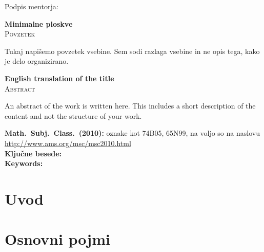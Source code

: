 \documentclass[12pt,a4paper,twoside]{article}
\newcommand{\naslovdela}{Minimalne ploskve}
\newcommand{\kljucnebesede}{} %
\newcommand{\keywords}{} %
\newcommand{\sep}{, }  %
\theoremstyle{definition} %
\theoremstyle{plain} %
\numberwithin{equation}{section}  %
\begin{document}
\vspace{2cm}
\hspace*{\fill} Podpis mentorja: \phantom{prostor za podpis}


\cleardoublepage
{}

\begin{center}
\textbf{\naslovdela} \\[3mm]
\textsc{Povzetek} \\[2mm]
\end{center}
Tukaj napišemo povzetek vsebine. Sem sodi razlaga vsebine in ne opis tega, kako je delo
organizirano.

\vfill
\begin{center}
\textbf{English translation of the title} \\[3mm] %
\textsc{Abstract}\\[2mm]
\end{center}

An abstract of the work is written here. This includes a short description of
the content and not the structure of your work.

\vfill\noindent
\textbf{Math.~Subj.~Class.~(2010):} oznake kot 74B05, 65N99, na voljo so na naslovu
\url{http://www.ams.org/msc/msc2010.html} \\[1mm]
\textbf{Ključne besede:} \kljucnebesede \\[1mm]
\textbf{Keywords:} \keywords

\cleardoublepage

\setcounter{page}{1}    %

\section{Uvod}

\section{Osnovni pojmi}
\end{document}
